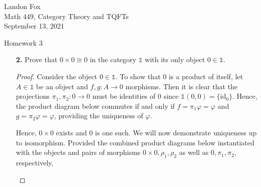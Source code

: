 \documentclass[ 12pt ]{article}
\begin{document}
\noindent Landon Fox \\
\noindent Math 449, Category Theory and TQFTs \\
\noindent September 13, 2021

\begin{center}
\Large Homework 3
\end{center}

\begin{enumerate}

	\item[\textbf{2.}] Prove that $0 \times 0 \cong 0$ in the category $\mathbb{1}$ with its only object $0 \in \mathbb{1}$.

		\begin{proof}
			Consider the object $0 \in \mathbb{1}$. To show that $0$ is a product of itself, let $A \in \mathbb{1}$ be an object and $f, g : A \to 0$ morphisms. Then it is clear that the projections $\pi_1, \pi_2 : 0 \to 0$ must be identities of $0$ since $\mathbb{1}(0, 0) = \{ \mathrm{id}_0 \}$. Hence, the product diagram below commutes if and only if $f = \pi_1 \varphi = \varphi$ and $g = \pi_2 \varphi = \varphi$, providing the uniqueness of $\varphi$.
			\begin{center}
			\end{center}
			Hence, $0 \times 0$ exists and $0$ is one such. We will now demonstrate uniqueness up to isomorphism. Provided the combined product diagrams below instantiated with the objects and pairs of morphisms $0 \times 0, \rho_1, \rho_2$ as well as $0, \pi_1, \pi_2$, respectively,
			\begin{center}
\end{center}
\end{proof}
\end{enumerate}
\end{document}
